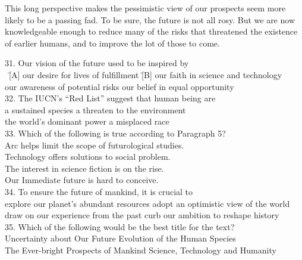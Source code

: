 This long perspective makes the pessimistic view of our prospects seem more likely to be a passing fad. To be sure, the future is not all rosy. But we are now knowledgeable enough to reduce many of the risks that threatened the existence of earlier humans, and to improve the lot of those to come.

\begin{tabbing}
31. Our vision of the future used to be inspired by\\
\hspace{0cm}\ \= [A] our desire for lives of fulfillment \quad\quad\quad\quad
\= [B] our faith in science and technology\\
\> [C] our awareness of potential risks
\> [D] our belief in equal opportunity\\

32. The IUCN’s “Red List” suggest that human being are\\
\> [A] a sustained species
\> [B] a threaten to the environment\\
\> [C] the world’s dominant power
\> [D] a misplaced race\\

33. Which of the following is true according to Paragraph 5?\\
\> [A] Arc helps limit the scope of futurological studies.\\
\> [B] Technology offers solutions to social problem.\\
\> [C] The interest in science fiction is on the rise.\\
\> [D] Our Immediate future is hard to conceive.\\

34. To ensure the future of mankind, it is crucial to\\
\> [A] explore our planet’s abundant resources
\> [B] adopt an optimistic view of the world\\
\> [C] draw on our experience from the past
\> [D] curb our ambition to reshape history\\

35. Which of the following would be the best title for the text?\\
\> [A] Uncertainty about Our Future
\> [B] Evolution of the Human Species\\
\> [C] The Ever-bright Prospects of Mankind
\> [D] Science, Technology and Humanity
\end{tabbing}